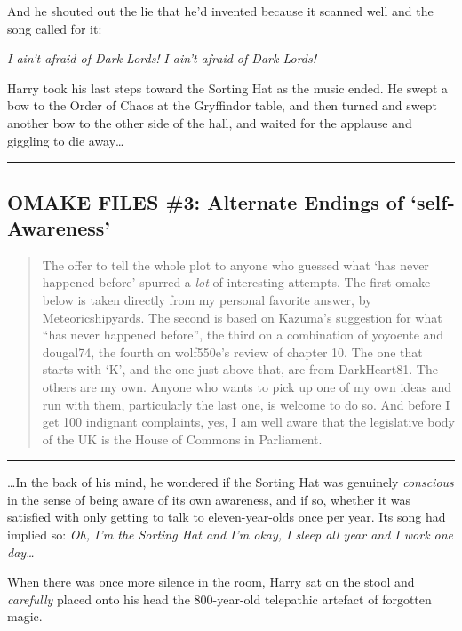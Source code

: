 And he shouted out the lie that he'd invented because it scanned well
and the song called for it:

\emph{I ain't afraid of Dark Lords!} \emph{I ain't afraid of Dark
Lords!}

Harry took his last steps toward the Sorting Hat as the music ended. He
swept a bow to the Order of Chaos at the Gryffindor table, and then
turned and swept another bow to the other side of the hall, and waited
for the applause and giggling to die away\ldots{}

\begin{center}\rule{3in}{0.4pt}\end{center}

\subsection{OMAKE FILES \#3: Alternate Endings of `self-Awareness'}

\begin{quote}
The offer to tell the whole plot to anyone who guessed what `has never
happened before' spurred a \emph{lot} of interesting attempts. The first
omake below is taken directly from my personal favorite answer, by
Meteoricshipyards. The second is based on Kazuma's suggestion for what
``has never happened before'', the third on a combination of yoyoente
and dougal74, the fourth on wolf550e's review of chapter 10. The one
that starts with `K', and the one just above that, are from DarkHeart81.
The others are my own. Anyone who wants to pick up one of my own ideas
and run with them, particularly the last one, is welcome to do so. And
before I get 100 indignant complaints, yes, I am well aware that the
legislative body of the UK is the House of Commons in Parliament.
\end{quote}

\begin{center}\rule{3in}{0.4pt}\end{center}

\ldots{}In the back of his mind, he wondered if the Sorting Hat was
genuinely \emph{conscious} in the sense of being aware of its own
awareness, and if so, whether it was satisfied with only getting to talk
to eleven-year-olds once per year. Its song had implied so: \emph{Oh,
I'm the Sorting Hat and I'm okay, I sleep all year and I work one
day\ldots{}}

When there was once more silence in the room, Harry sat on the stool and
\emph{carefully} placed onto his head the 800-year-old telepathic
artefact of forgotten magic.

